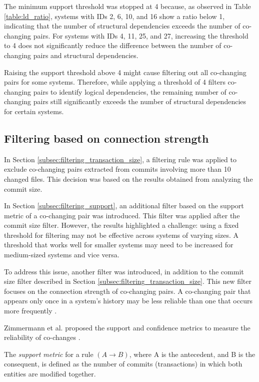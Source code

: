 The minimum support threshold was stopped at 4 because, as observed in Table \ref{table:ld_ratio}, systems with IDs 2, 6, 10, and 16 show a ratio below 1, indicating that the number of structural dependencies exceeds the number of co-changing pairs. For systems with IDs 4, 11, 25, and 27, increasing the threshold to 4 does not significantly reduce the difference between the number of co-changing pairs and structural dependencies.

Raising the support threshold above 4 might cause filtering out all co-changing pairs for some systems. Therefore, while applying a threshold of 4 filters co-changing pairs to identify logical dependencies, the remaining number of co-changing pairs still significantly exceeds the number of structural dependencies for certain systems.


\subsection{Filtering based on connection strength}
\label{subsec:filtering_connection_strength}

\hspace{4em}In Section \ref{subsec:filtering_transaction_size}, a filtering rule was applied to exclude co-changing pairs extracted from commits involving more than 10 changed files. This decision was based on the results obtained from analyzing the commit size.

In Section \ref{subsec:filtering_support}, an additional filter based on the support metric of a co-changing pair was introduced. This filter was applied after the commit size filter. However, the results highlighted a challenge: using a fixed threshold for filtering may not be effective across systems of varying sizes. A threshold that works well for smaller systems may need to be increased for medium-sized systems and vice versa.

To address this issue, another filter was introduced, in addition to the commit size filter described in Section \ref{subsec:filtering_transaction_size}. This new filter focuses on the connection strength of co-changing pairs. A co-changing pair that appears only once in a system's history may be less reliable than one that occurs more frequently \cite{cluster-access}.

Zimmermann et al. proposed the support and confidence metrics to measure the reliability of co-changes \cite{Zimmermann:2004:MVH:998675.999460}.

The \textit{support metric} for a rule $(A \rightarrow B)$, where A is the antecedent, and B is the consequent, is defined as the number of commits (transactions) in which both entities are modified together.

